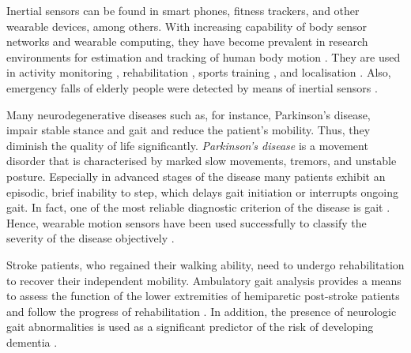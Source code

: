 Inertial sensors can be found in smart phones, fitness trackers, and other wearable devices, among others. With increasing capability of body sensor networks and wearable computing, they have become prevalent in research environments for estimation and tracking of human body motion \cite{bennett_motion_2014}. They are used in activity monitoring \cite{veltink_detection_96, najafi_ambulatory_03, ermes_sports_08}, rehabilitation \cite{giggins_rehabilitation_13, lupinski_ligament_11}, sports training \cite{bonnet_squat_13, ermes_sports_08}, and localisation \cite{hoflinger_localization_13, Bennett_distance_13}. Also, emergency falls of elderly people were detected by means of inertial sensors \cite{bourke_threshold-based_2008, bourke_assessment-waist_2010, bourke_fall_detection_2008}.

Many neurodegenerative diseases such as, for instance, Parkinson's disease, impair stable stance and gait and reduce the patient's mobility. Thus, they diminish the quality of life significantly. \emph{Parkinson's disease} is a movement disorder that is characterised by marked slow movements, tremors, and unstable posture. Especially in advanced stages of the disease many patients exhibit an episodic, brief inability to step, which delays gait initiation or interrupts ongoing gait. In fact, one of the most reliable diagnostic criterion of the disease is gait \cite{tao_gait_2012}. Hence, wearable motion sensors have been used successfully to classify the severity of the disease objectively \cite{mancini_anticipatory_2009, palmerini_feature_2011, klerk_long-term_2009}.

Stroke patients, who regained their walking ability, need to undergo rehabilitation to recover their independent mobility. Ambulatory gait analysis provides a means to assess the function of the lower extremities of hemiparetic post-stroke patients and follow the progress of rehabilitation \cite{tao_gait_2012, saremi_reliability_2006}. In addition, the presence of neurologic gait abnormalities is used as a significant predictor of the risk of developing dementia \cite{verghese_dementia_2002}.

